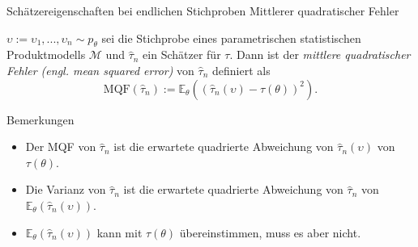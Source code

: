 \documentclass[
  8pt,
  ignorenonframetext,
]{beamer}
\providecommand{\tightlist}{%
  \setlength{\itemsep}{0pt}\setlength{\parskip}{0pt}}
\newcommand{\ups} {\upsilon}
\begin{document}
\begin{frame}{\small Schätzereigenschaften bei endlichen Stichproben
\textbar{} Mittlerer quadratischer Fehler}
\protect\hypertarget{schuxe4tzereigenschaften-bei-endlichen-stichproben-mittlerer-quadratischer-fehler}{}
\small
\begin{definition}
\justifying
$\ups := \ups_1,...,\ups_n \sim  p_\theta$ sei die Stichprobe eines parametrischen
statistischen Produktmodells $\mathcal{M}$ und $\hat{\tau}_n$ ein Schätzer für $\tau$.
Dann ist der \textit{mittlere quadratischer Fehler (engl. mean squared error)}
von $\hat{\tau}_n$ definiert als
\begin{equation}
\mbox{MQF}(\hat{\tau}_n) := \mathbb{E}_\theta\left((\hat{\tau}_n(\ups) - \tau(\theta))^2\right).
\end{equation}
\end{definition}

\footnotesize

Bemerkungen

\begin{itemize}
\tightlist
\item
  Der MQF von \(\hat{\tau}_n\) ist die erwartete quadrierte Abweichung
  von \(\hat{\tau}_n(\ups)\) von \(\tau(\theta)\).
\item
  Die Varianz von \(\hat{\tau}_n\) ist die erwartete quadrierte
  Abweichung von \(\hat{\tau}_n\) von
  \(\mathbb{E}_\theta(\hat{\tau}_n(\ups))\).
\item
  \(\mathbb{E}_\theta(\hat{\tau}_n(\ups))\) kann mit \(\tau(\theta)\)
  übereinstimmen, muss es aber nicht.
\end{itemize}
\end{frame}
\end{document}
